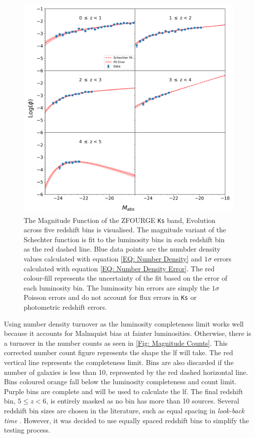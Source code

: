 \begin{figure}[t!]
    \centering
    \includegraphics[width=\linewidth]{Figures/Magnitude Function.png}
    \caption{The Magnitude Function of the ZFOURGE \texttt{Ks} band, Evolution across five redshift bins is visualised. The magnitude variant of the Schechter function is fit to the luminosity bins in each redshift bin as the red dashed line. Blue data points are the numbder density values calculated with equation \ref{EQ: Number Density} and $1\sigma$ errors calculated with equation \ref{EQ: Number Density Error}. The red colour-fill represents the uncertainty of the fit based on the error of each luminosity bin. The luminosity bin errors are simply the $1\sigma$ Poisson errors and do not account for flux errors in \texttt{Ks} or photometric redshift errors.}
    \label{fig: Magnitude Function}
\end{figure}

Using number density turnover as the luminosity completeness limit works well because it accounts for Malmquist bias at fainter luminosities. Otherwise, there is a turnover in the number counts as seen in \cref{Fig: Magnitude Counts}. This corrected number count figure represents the shape the \gls{lf} will take. The red vertical line represents the completeness limit. Bins are also discarded if the number of galaxies is less than 10, represented by the red dashed horizontal line. Bins coloured orange fall below the luminosity completeness and count limit. Purple bins are complete and will be used to calculate the \gls{lf}. The final redshift bin, $5 \leq z < 6$, is entirely masked as no bin has more than 10 sources. Several redshift bin sizes are chosen in the literature, such as equal spacing in \textit{look-back time} \citep{thorne_deep_2022}. However, it was decided to use equally spaced redshift bins to simplify the testing process. 

